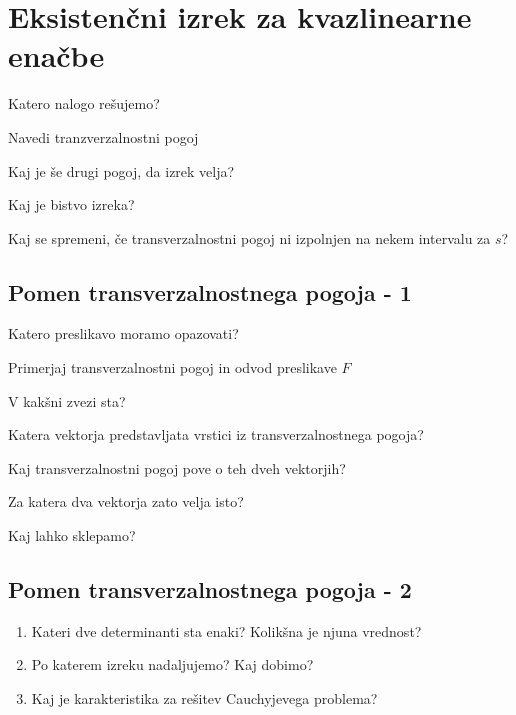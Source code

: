 \documentclass{article}
\begin{document}
    \section{Eksistenčni izrek za kvazlinearne enačbe}
    \begin{enumerate}
        \item Katero nalogo rešujemo?
        \item Navedi tranzverzalnostni pogoj
        {\color{red}\item Kaj je še drugi pogoj, da izrek velja?}
        {\color{red}\item Kaj je bistvo izreka?}
        \item Kaj se spremeni, če transverzalnostni pogoj ni izpolnjen na nekem intervalu za $s$?
    \end{enumerate}

    \subsection{Pomen transverzalnostnega pogoja - 1}
    \begin{enumerate}
        {\color{red}\item Katero preslikavo moramo opazovati?}
        \item Primerjaj transverzalnostni pogoj in odvod preslikave $F$
        \item V kakšni zvezi sta?
        {\color{red}\item Katera vektorja predstavljata vrstici iz transverzalnostnega pogoja?}
        \item Kaj transverzalnostni pogoj pove o teh dveh vektorjih?
        \item Za katera dva vektorja zato velja isto?
        {\color{red}\item Kaj lahko sklepamo?}
    \end{enumerate}

    \subsection{Pomen transverzalnostnega pogoja - 2}
    \begin{enumerate}
        \item Kateri dve determinanti sta enaki? Kolikšna je njuna vrednost?
        \item Po katerem izreku nadaljujemo? Kaj dobimo?
        \item Kaj je karakteristika za rešitev Cauchyjevega problema?
    \end{enumerate}
\end{document}
